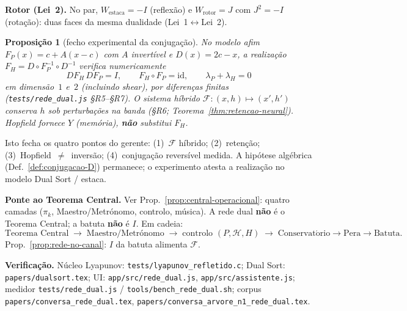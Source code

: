 \documentclass[11pt,a4paper]{article}
\newtheorem{proposicao}{Proposição}
\newcommand{\code}[1]{\texttt{#1}}
\begin{document}
\noindent \textbf{Rotor (Lei~2).} No par,
$W_{\mathrm{estaca}}=-I$ (reflexão) e
$W_{\mathrm{rotor}}=J$ com $J^{2}=-I$ (rotação): duas faces da mesma
dualidade (Lei~1$\leftrightarrow$Lei~2).

\begin{proposicao}[fecho experimental da conjugação]\label{prop:fecho-conj-exp}
No modelo afim $F_P(x)=c+A(x-c)$ com $A$ invertível e
$D(x)=2c-x$, a realização
$F_H=D\circ F_P^{-1}\circ D^{-1}$ verifica numericamente
\[
\boxed{DF_H\,DF_P=I},
\qquad
\boxed{F_H\circ F_P=\mathrm{id}},
\qquad
\boxed{\lambda_P+\lambda_H=0}
\]
em dimensão~$1$ e~$2$ (incluindo shear), por diferenças finitas
(\code{tests/rede\_dual.js} §R5--§R7). O sistema híbrido
$\mathcal{F}\colon(x,h)\mapsto(x',h')$ conserva $h$ sob perturbações
na banda (§R6; Teorema~\ref{thm:retencao-neural}).
Hopfield fornece $Y$ (memória), \textbf{não} substitui $F_H$.
\end{proposicao}

\noindent Isto fecha os quatro pontos do gerente:
(1)~$\mathcal{F}$ híbrido; (2)~retenção; (3)~Hopfield~$\neq$~inversão;
(4)~conjugação reversível medida. A hipótese algébrica
(Def.~\ref{def:conjugacao-D}) permanece; o experimento atesta a
realização no modelo Dual Sort / estaca.

\noindent \textbf{Ponte ao Teorema Central.} Ver
Prop.~\ref{prop:central-operacional}: quatro camadas
($\pi_k$, Maestro/Metrónomo, controlo, música).
A rede dual \textbf{não} é o Teorema Central; a batuta
\textbf{não} é $I$. Em cadeia:
\[
\boxed{
\text{Teorema Central}
\;\longrightarrow\;
\text{Maestro/Metrónomo}
\;\longrightarrow\;
\text{controlo }(P,\mathcal{H},H)
\;\longrightarrow\;
\mathrm{Conservat\acute{o}rio}\!\to\!\mathrm{Pera}\!\to\!\mathrm{Batuta}.
}
\]
Prop.~\ref{prop:rede-no-canal}: $I$ da batuta alimenta $\mathcal{F}$.

\noindent \textbf{Verificação.} Núcleo Lyapunov:
\code{tests/lyapunov\_refletido.c}; Dual Sort:
\code{papers/dualsort.tex}; UI:
\code{app/src/rede\_dual.js}, \code{app/src/assistente.js};
medidor \code{tests/rede\_dual.js} /
\code{tools/bench\_rede\_dual.sh}; corpus
\code{papers/conversa\_rede\_dual.tex},
\code{papers/conversa\_arvore\_n1\_rede\_dual.tex}.
\end{document}
